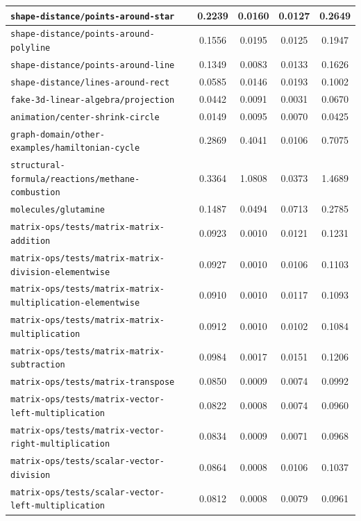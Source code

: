 \begin{longtable}{|p{6.5cm}|c|c|c|c|}
    \texttt{shape-distance/points-around-star} & 0.2239 & 0.0160 & 0.0127 & 0.2649 \\ \hline
    \texttt{shape-distance/points-around-polyline} & 0.1556 & 0.0195 & 0.0125 & 0.1947 \\ \hline
    \texttt{shape-distance/points-around-line} & 0.1349 & 0.0083 & 0.0133 & 0.1626 \\ \hline
    \texttt{shape-distance/lines-around-rect} & 0.0585 & 0.0146 & 0.0193 & 0.1002 \\ \hline
    \texttt{fake-3d-linear-algebra/projection} & 0.0442 & 0.0091 & 0.0031 & 0.0670 \\ \hline
    \texttt{animation/center-shrink-circle} & 0.0149 & 0.0095 & 0.0070 & 0.0425 \\ \hline
    \texttt{graph-domain/other-examples/hamiltonian-cycle} & 0.2869 & 0.4041 & 0.0106 & 0.7075 \\ \hline
    \texttt{structural-formula/reactions/methane-combustion} & 0.3364 & 1.0808 & 0.0373 & 1.4689 \\ \hline
    \texttt{molecules/glutamine} & 0.1487 & 0.0494 & 0.0713 & 0.2785 \\ \hline
    \texttt{matrix-ops/tests/matrix-matrix-addition} & 0.0923 & 0.0010 & 0.0121 & 0.1231 \\ \hline
    \texttt{matrix-ops/tests/matrix-matrix-division-elementwise} & 0.0927 & 0.0010 & 0.0106 & 0.1103 \\ \hline
    \texttt{matrix-ops/tests/matrix-matrix-multiplication-elementwise} & 0.0910 & 0.0010 & 0.0117 & 0.1093 \\ \hline
    \texttt{matrix-ops/tests/matrix-matrix-multiplication} & 0.0912 & 0.0010 & 0.0102 & 0.1084 \\ \hline
    \texttt{matrix-ops/tests/matrix-matrix-subtraction} & 0.0984 & 0.0017 & 0.0151 & 0.1206 \\ \hline
    \texttt{matrix-ops/tests/matrix-transpose} & 0.0850 & 0.0009 & 0.0074 & 0.0992 \\ \hline
    \texttt{matrix-ops/tests/matrix-vector-left-multiplication} & 0.0822 & 0.0008 & 0.0074 & 0.0960 \\ \hline
    \texttt{matrix-ops/tests/matrix-vector-right-multiplication} & 0.0834 & 0.0009 & 0.0071 & 0.0968 \\ \hline
    \texttt{matrix-ops/tests/scalar-vector-division} & 0.0864 & 0.0008 & 0.0106 & 0.1037 \\ \hline
    \texttt{matrix-ops/tests/scalar-vector-left-multiplication} & 0.0812 & 0.0008 & 0.0079 & 0.0961 \\ \hline

\end{longtable}
